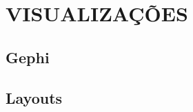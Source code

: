 \section{\texorpdfstring{\MakeUppercase{Visualizações}}{}}
\label{conceitos__visualizacoes}
\subsection{Gephi}
\label{conceitos__visualizacoes--gephi}


\subsection{Layouts}
\label{conceitos__visualizacoes--layouts}

